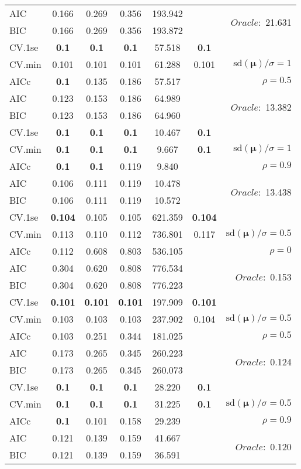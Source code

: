 \begin{table}
\begin{center}
\begin{tabular}{l*{5}{c}|r}
AIC & 0.166 & 0.269 & 0.356 & 193.942 & &  \multirow{2}{*}{$Oracle: $ 21.631} \\
BIC & 0.166 & 0.269 & 0.356 & 193.872 & &  \\
 \hline 
CV.1se & {\bf 0.1} & {\bf 0.1} & {\bf 0.1} & 57.518 & {\bf 0.1} & \\
CV.min & 0.101 & 0.101 & 0.101 & 61.288 & 0.101 &  $\mathrm{sd}(\mathbf{\mu})/\sigma=1$ \\
AICc & {\bf 0.1} & 0.135 & 0.186 & 57.517 & & $\rho=0.5$ \\
AIC & 0.123 & 0.153 & 0.186 & 64.989 & &  \multirow{2}{*}{$Oracle: $ 13.382} \\
BIC & 0.123 & 0.153 & 0.186 & 64.960 & &  \\
 \hline 
CV.1se & {\bf 0.1} & {\bf 0.1} & {\bf 0.1} & 10.467 & {\bf 0.1} & \\
CV.min & {\bf 0.1} & {\bf 0.1} & {\bf 0.1} & 9.667 & {\bf 0.1} &  $\mathrm{sd}(\mathbf{\mu})/\sigma=1$ \\
AICc & {\bf 0.1} & {\bf 0.1} & 0.119 & 9.840 & & $\rho=0.9$ \\
AIC & 0.106 & 0.111 & 0.119 & 10.478 & &  \multirow{2}{*}{$Oracle: $ 13.438} \\
BIC & 0.106 & 0.111 & 0.119 & 10.572 & &  \\
 \hline 
CV.1se & {\bf 0.104} & 0.105 & 0.105 & 621.359 & {\bf 0.104} & \\
CV.min & 0.113 & 0.110 & 0.112 & 736.801 & 0.117 &  $\mathrm{sd}(\mathbf{\mu})/\sigma=0.5$ \\
AICc & 0.112 & 0.608 & 0.803 & 536.105 & & $\rho=0$ \\
AIC & 0.304 & 0.620 & 0.808 & 776.534 & &  \multirow{2}{*}{$Oracle: $ 0.153} \\
BIC & 0.304 & 0.620 & 0.808 & 776.223 & &  \\
 \hline 
CV.1se & {\bf 0.101} & {\bf 0.101} & {\bf 0.101} & 197.909 & {\bf 0.101} & \\
CV.min & 0.103 & 0.103 & 0.103 & 237.902 & 0.104 &  $\mathrm{sd}(\mathbf{\mu})/\sigma=0.5$ \\
AICc & 0.103 & 0.251 & 0.344 & 181.025 & & $\rho=0.5$ \\
AIC & 0.173 & 0.265 & 0.345 & 260.223 & &  \multirow{2}{*}{$Oracle: $ 0.124} \\
BIC & 0.173 & 0.265 & 0.345 & 260.073 & &  \\
 \hline 
CV.1se & {\bf 0.1} & {\bf 0.1} & {\bf 0.1} & 28.220 & {\bf 0.1} & \\
CV.min & {\bf 0.1} & {\bf 0.1} & {\bf 0.1} & 31.225 & {\bf 0.1} &  $\mathrm{sd}(\mathbf{\mu})/\sigma=0.5$ \\
AICc & {\bf 0.1} & 0.101 & 0.158 & 29.239 & & $\rho=0.9$ \\
AIC & 0.121 & 0.139 & 0.159 & 41.667 & &  \multirow{2}{*}{$Oracle: $ 0.120} \\
BIC & 0.121 & 0.139 & 0.159 & 36.591 & &  \\
 \hline 
\end{tabular}
\end{center}
\vspace{-1cm}
\end{table}




